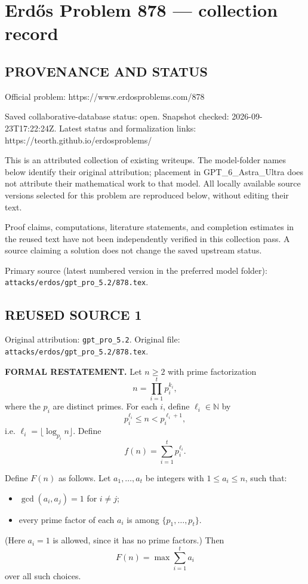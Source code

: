 \section*{Erd\H{o}s Problem 878 --- collection record}

\subsection*{PROVENANCE AND STATUS}
Official problem: https://www.erdosproblems.com/878

Saved collaborative-database status: open.
Snapshot checked: 2026-09-23T17:22:24Z.
Latest status and formalization links: https://teorth.github.io/erdosproblems/

This is an attributed collection of existing writeups. The model-folder names below identify their original attribution; placement in GPT\_6\_Astra\_Ultra does not attribute their mathematical work to that model. All locally available source versions selected for this problem are reproduced below, without editing their text.

Proof claims, computations, literature statements, and completion estimates in the reused text have not been independently verified in this collection pass. A source claiming a solution does not change the saved upstream status.

Primary source (latest numbered version in the preferred model folder): \texttt{attacks/erdos/gpt\_pro\_5.2/878.tex}.

\subsection*{REUSED SOURCE 1}
Original attribution: \texttt{gpt\_pro\_5.2}.
Original file: \texttt{attacks/erdos/gpt\_pro\_5.2/878.tex}.


\noindent\textbf{FORMAL RESTATEMENT.}
Let $n\ge 2$ with prime factorization
\[
 n=\prod_{i=1}^t p_i^{k_i},
\]
where the $p_i$ are distinct primes.
For each $i$, define $\ell_i\in\mathbb N$ by
\[
 p_i^{\ell_i}\le n < p_i^{\ell_i+1},
\]
i.e. $\ell_i=\lfloor\log_{p_i} n\rfloor$.
Define
\[
 f(n)=\sum_{i=1}^t p_i^{\ell_i}.
\]

Define $F(n)$ as follows. Let $a_1,\dots,a_t$ be integers with $1\le a_i\le n$, such that:
\begin{itemize}
\item $\gcd(a_i,a_j)=1$ for $i\ne j$;
\item every prime factor of each $a_i$ is among $\{p_1,\dots,p_t\}$.
\end{itemize}
(Here $a_i=1$ is allowed, since it has no prime factors.)
Then
\[
 F(n)=\max \sum_{i=1}^t a_i
\]
over all such choices.

